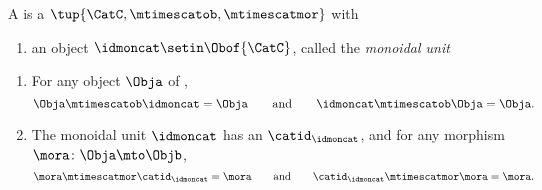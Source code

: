 \begin{ctdefinition}
    \label{def:strict-monoidal-stacking-semicat}
    A  is a  $\tup{\CatC, \mtimescatob, \mtimescatmor}$ with

    \constit

    \begin{enumerate}
        \item an object $\idmoncat \setin \Obof{\CatC}$, called the \emph{monoidal unit}
    \end{enumerate}

    \condit

    \begin{enumerate}
        \item For any object $\Obja$ of \CatC,
              \begin{equation}
                  \Obja \mtimescatob \idmoncat = \Obja \qquad \text{and} \qquad \idmoncat \mtimescatob \Obja = \Obja.
              \end{equation}
        \item The monoidal unit $\idmoncat$ has an  $\catid_\idmoncat$, and for any morphism $\mora \colon \Obja \mto \Objb$,
              \begin{equation}
                  \mora \mtimescatmor \catid_\idmoncat = \mora \qquad \text{and} \qquad \catid_\idmoncat \mtimescatmor  \mora = \mora.
              \end{equation}
    \end{enumerate}
\end{ctdefinition}


